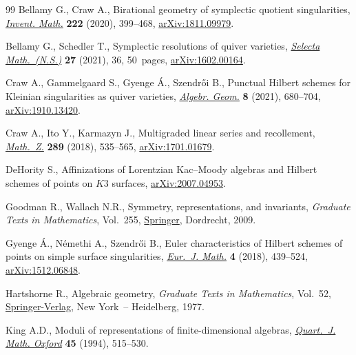 \documentclass[11pt]{article}
\numberwithin{equation}{section}
\numberwithin{equation}{section}
\begin{document}
\begin{thebibliography}{99}
Bellamy G., Craw A., Birational geometry of symplectic quotient singularities,
 \href{https://doi.org/10.1007/s00222-020-00972-9}{\textit{Invent. Math.}} \textbf{222} (2020), 399--468, \href{https://arxiv.org/abs/1811.09979}{arXiv:1811.09979}.

Bellamy G., Schedler T., Symplectic resolutions of quiver varieties,
 \href{https://doi.org/10.1007/s00029-021-00647-0}{\textit{Selecta Math.~(N.S.)}} \textbf{27} (2021), 36, 50~pages,
 \href{https://arxiv.org/abs/1602.00164}{arXiv:1602.00164}.

Craw A., Gammelgaard S., Gyenge \'A., Szendr\H{o}i B., Punctual {H}ilbert schemes
 for {K}leinian singularities as quiver varieties, \href{https://doi.org/10.14231/AG-2021-021}{\textit{Algebr. Geom.}}
 \textbf{8} (2021), 680--704, \href{https://arxiv.org/abs/1910.13420}{arXiv:1910.13420}.

Craw A., Ito Y., Karmazyn J., Multigraded linear series and recollement,
 \href{https://doi.org/10.1007/s00209-017-1965-1}{\textit{Math.~Z.}} \textbf{289} (2018), 535--565, \href{https://arxiv.org/abs/1701.01679}{arXiv:1701.01679}.

DeHority S., Affinizations of {L}orentzian {K}ac--{M}oody algebras and
 {H}ilbert schemes of points on {$K3$} surfaces, \href{https://arxiv.org/abs/2007.04953}{arXiv:2007.04953}.

Goodman R., Wallach N.R., Symmetry, representations, and invariants,
 \textit{Graduate Texts in Mathematics}, Vol.~255, \href{https://doi.org/10.1007/978-0-387-79852-3}{Springer}, Dordrecht, 2009.

Gyenge \'A., N\'emethi A., Szendr\H{o}i B., Euler characteristics of {H}ilbert
 schemes of points on simple surface singularities, \href{https://doi.org/10.1007/s40879-018-0222-4}{\textit{Eur.~J. Math.}}
 \textbf{4} (2018), 439--524, \href{https://arxiv.org/abs/1512.06848}{arXiv:1512.06848}.

Hartshorne R., Algebraic geometry, \textit{Graduate Texts in Mathematics},
 Vol.~52, \href{https://doi.org/10.1007/978-1-4757-3849-0}{Springer-Verlag}, New York~-- Heidelberg, 1977.

King A.D., Moduli of representations of finite-dimensional algebras,
 \href{https://doi.org/10.1093/qmath/45.4.515}{\textit{Quart.~J. Math. Oxford}} \textbf{45} (1994), 515--530.


\end{thebibliography}
\end{document}
